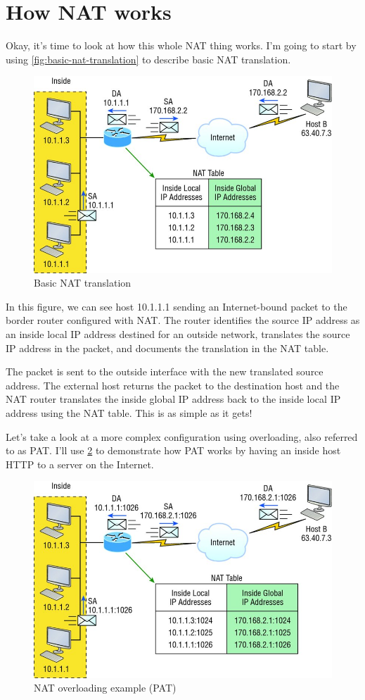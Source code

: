 \section{How NAT works}

Okay, it's time to look at how this whole NAT thing works.
I'm going to start by using \vref{fig:basic-nat-translation} to describe basic NAT translation.

\begin{figure}
   \includegraphics[width=.7\textwidth]{images/c13f002.jpg}
   \centering
   \caption{Basic NAT translation}
   \label{fig:basic-nat-translation}
\end{figure}

In this figure, we can see host 10.1.1.1 sending an Internet-bound packet to the border router configured with NAT.
The router identifies the source IP address
as an inside local IP address destined for an outside network,
translates the source IP address in the packet, and documents the
translation in the NAT table.

The packet is sent to the outside interface with the new translated
source address. The external host returns the packet to the destination
host and the NAT router translates the inside global IP address back to
the inside local IP address using the NAT table. This is as simple as it gets!

Let's take a look at a more complex configuration using overloading, also referred to as PAT.
I'll use \cref{fig:pat-example} to demonstrate how PAT works by having an inside host HTTP to a server on the Internet.


\begin{figure}
   \centering
   \includegraphics[width=.7\textwidth]{images/c13f003.jpg}
   \caption{NAT overloading example (PAT)}
   \label{fig:pat-example}
\end{figure}



